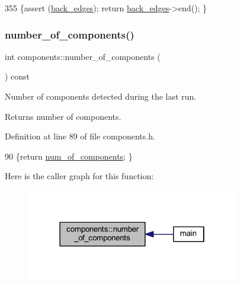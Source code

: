 \begin{DoxyCode}
355     \{assert (\mbox{\hyperlink{classdfs_a1dc18a7df8d6b238d5301c92fc7540fa}{back\_edges}}); \textcolor{keywordflow}{return} \mbox{\hyperlink{classdfs_a1dc18a7df8d6b238d5301c92fc7540fa}{back\_edges}}->end(); \}
\end{DoxyCode}
\mbox{\label{classcomponents_ad3206d2d050ed7719f7140ea3bee81f8}} 
\subsubsection{\texorpdfstring{number\+\_\+of\+\_\+components()}{number\_of\_components()}}
{\footnotesize\ttfamily int components\+::number\+\_\+of\+\_\+components (\begin{DoxyParamCaption}{ }\end{DoxyParamCaption}) const\hspace{0.3cm}{\ttfamily [inline]}}



Number of components detected during the last run. 

\begin{DoxyReturn}{Returns}
number of components. 
\end{DoxyReturn}


Definition at line 89 of file components.\+h.


\begin{DoxyCode}
90     \{\textcolor{keywordflow}{return} \mbox{\hyperlink{classcomponents_ad5a54d7313e23f8c6a2c6347e6ee70a0}{num\_of\_components}}; \}
\end{DoxyCode}
Here is the caller graph for this function\+:\nopagebreak
\begin{figure}[H]
\begin{center}
\leavevmode
\includegraphics[width=262pt]{classcomponents_ad3206d2d050ed7719f7140ea3bee81f8_icgraph}
\end{center}
\end{figure}
\mbox{\label{classdfs_ae8849a552721ad4af5d9a81c6da35822}} 
